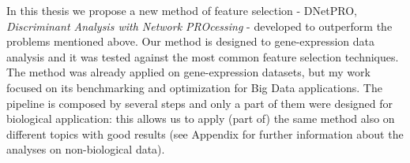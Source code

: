 \documentclass{standalone}
\begin{document}
In this thesis we propose a new method of feature selection - DNetPRO, \emph{Discriminant Analysis with Network PROcessing} - developed to outperform the problems mentioned above.
Our method is designed to gene-expression data analysis and it was tested against the most common feature selection techniques.
The method was already applied on gene-expression datasets, but my work focused on its benchmarking and optimization for Big Data applications.
The pipeline is composed by several steps and only a part of them were designed for biological application: this allows us to apply (part of) the same method also on different topics with good results (see Appendix for further information about the analyses on non-biological data).
\end{document}
